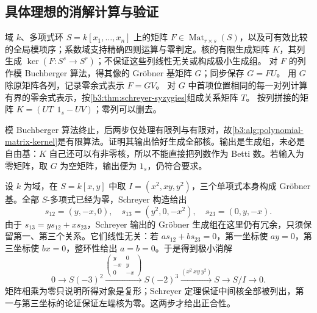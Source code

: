 \subsection{具体理想的消解计算与验证}
\label{b3:subsec:2104:03}

\begin{algorithm}[htbp]
	\caption{多项式矩阵求核}
	\label{b3:alg:polynomial-matrix-kernel}
	\begin{algorithmsteps}{域 \(k\)、多项式环 \(S=k[x_1,\ldots,x_n]\) 上的矩阵 \(F\in\operatorname{Mat}_{r\times s}(S)\)，以及可有效比较的全局模项序；系数域支持精确四则运算与零判定。}{核的有限生成矩阵 \(K\)，其列生成 \(\ker(F:S^s\rightarrow S^r)\)；不保证这些列线性无关或构成极小生成组。}
		\State 对 \(F\) 的列作模 Buchberger 算法，得其像的 Gröbner 基矩阵 \(G\)；同步保存 \(G=FU\)。
		\State 用 \(G\) 除原矩阵各列，记录零余式表示 \(F=GV\)。
		\State 对 \(G\) 中首项位置相同的每一对列计算有界的零余式表示，按\cref{b3:thm:schreyer-syzygies}组成关系矩阵 \(T\)。
		\State \Return 按列拼接的矩阵 \(K=(UT\ \ 1_s-UV)\)；零列可以删去。
	\end{algorithmsteps}
\end{algorithm}

模 Buchberger 算法终止，后两步仅处理有限列与有限对，故\cref{b3:alg:polynomial-matrix-kernel}是有限算法。证明其输出恰好生成全部核。输出是生成组，未必是自由基：\(K\) 自己还可以有非零核，所以不能直接把列数作为 Betti 数。若输入为零矩阵，取 \(G\) 为空矩阵，输出便为 \(1_s\)，仍符合要求。

\ProseParagraphBreak
设 \(k\) 为域，在 \(S=k[x,y]\) 中取 \(I=(x^2,xy,y^2)\)，三个单项式本身构成 Gröbner 基。全部 \(S\)-多项式已经为零，Schreyer 构造给出
\[
	s_{12}=(y,-x,0),\quad s_{13}=(y^2,0,-x^2),\quad s_{23}=(0,y,-x).
\]
由于 \(s_{13}=ys_{12}+xs_{23}\)，Schreyer 输出的 Gröbner 生成组在这里仍有冗余，只须保留第一、第三个关系。它们线性无关：若 \(as_{12}+bs_{23}=0\)，第一坐标使 \(ay=0\)，第三坐标使 \(bx=0\)，整环性给出 \(a=b=0\)。于是得到极小消解
\begin{equation}\label{b3:eq:square-maximal-resolution}
	0\longrightarrow S(-3)^2
	\xrightarrow{\left(\begin{smallmatrix}y&0\\-x&y\\0&-x\end{smallmatrix}\right)}
	S(-2)^3\xrightarrow{(x^2\ xy\ y^2)}S \longrightarrow S/I\longrightarrow0.
\end{equation}
矩阵相乘为零只说明所得对象是复形；Schreyer 定理保证中间核全部被列出，第一与第三坐标的论证保证左端核为零。这两步才给出正合性。

